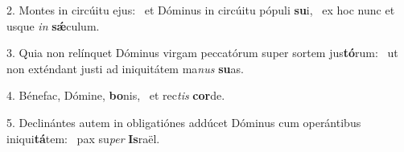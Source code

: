 2. Montes in circúitu ejus: \dag\  et Dóminus in circúitu pópuli \textbf{su}i, \ast\  ex hoc nunc et usque \textit{in} \textbf{sǽ}culum.\

3. Quia non relínquet Dóminus virgam peccatórum super sortem jus\textbf{tó}rum: \ast\  ut non exténdant justi ad iniquitátem ma\textit{nus} \textbf{su}as.\

4. Bénefac, Dómine, \textbf{bo}nis, \ast\  et rec\textit{tis} \textbf{cor}de.\

5. Declinántes autem in obligatiónes addúcet Dóminus cum operántibus iniqui\textbf{tá}tem: \ast\  pax su\textit{per} \textbf{Is}raël.\

